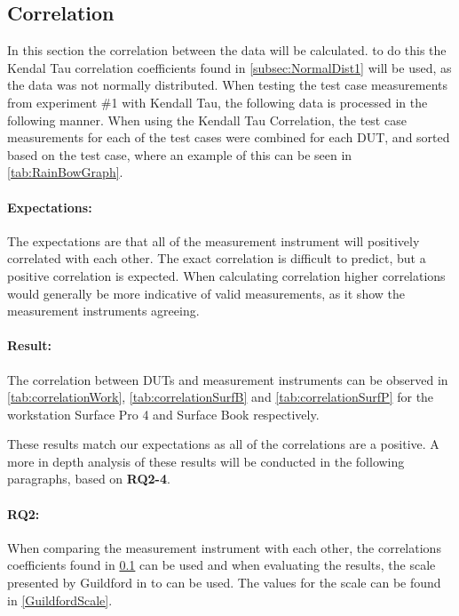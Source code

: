 \subsection{Correlation}\label{subsec:correlation1}
In this section the correlation between the data will be calculated. to do this the Kendal Tau correlation coefficients found in \cref{subsec:NormalDist1} will be used, as the data was not normally distributed. When testing the test case measurements from experiment \#1 with Kendall Tau, the following data is processed in the following manner. When using the Kendall Tau Correlation, the test case measurements for each of the test cases were combined for each DUT, and sorted based on the test case, where an example of this can be seen in \cref{tab:RainBowGraph}.



\paragraph{Expectations:} The expectations are that all of the measurement instrument will positively correlated with each other. The exact correlation is difficult to predict, but a positive correlation is expected. When calculating correlation higher correlations would generally be more indicative of valid measurements, as it show the measurement instruments agreeing.

\paragraph{Result:} The correlation between DUTs and measurement instruments can be observed in \cref{tab:correlationWork},  \cref{tab:correlationSurfB} and \cref{tab:correlationSurfP} for the workstation Surface Pro 4 and Surface Book respectively.




These results match our expectations as all of the correlations are a positive. A more in depth analysis of these results will be conducted in the following paragraphs, based on \textbf{RQ2-4}.

\paragraph{RQ2:} When comparing the measurement instrument with each other, the correlations coefficients found in \cref{subsec:correlation1} can be used and when evaluating the results, the scale presented by Guildford in \cite[219]{guilford1950fundamental} to can be used. The values for the scale can be found in \cref{GuildfordScale}.


